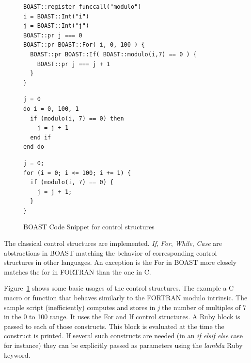 \documentclass[11pt, a4paper, twoside]{montblanc}
\begin{document}
\begin{figure}
\begin{lstlisting}
BOAST::register_funccall("modulo")
i = BOAST::Int("i")
j = BOAST::Int("j")
BOAST::pr j === 0
BOAST::pr BOAST::For( i, 0, 100 ) {
  BOAST::pr BOAST::If( BOAST::modulo(i,7) == 0 ) {
    BOAST::pr j === j + 1
  }
}
\end{lstlisting}

\begin{minipage}[b]{0.47\linewidth}
\centering
{}

\begin{lstlisting}
j = 0
do i = 0, 100, 1
  if (modulo(i, 7) == 0) then
    j = j + 1
  end if
end do
\end{lstlisting}
\end{minipage}
\hspace{0.04\linewidth}
\begin{minipage}[b]{0.47\linewidth}
\centering
{}

\begin{lstlisting}
j = 0;
for (i = 0; i <= 100; i += 1) {
  if (modulo(i, 7) == 0) {
    j = j + 1;
  }
}
\end{lstlisting}
\end{minipage}
\caption{BOAST Code Snippet for control structures}
\label{fig:BOAST_control}
\end{figure}

The classical control structures are implemented. \emph{If}, \emph{For},
\emph{While}, \emph{Case} are abstractions in BOAST matching the behavior of
corresponding control structures in other languages. An exception is the For in
BOAST more closely matches the for in FORTRAN than the one in C.

Figure~\ref{fig:BOAST_control} shows some basic usages of the control structures.
The example a C macro or function that behaves similarly to the FORTRAN modulo
intrinsic. The sample script (inefficiently) computes and stores in \emph{j} the
number of multiples of $7$ in the 0 to 100 range. It uses the For and If control
structures. A Ruby block is passed to each of those constructs. This block is
evaluated at the time the construct is printed. If several such constructs are
needed (in an \emph{if elsif else} case for instance) they can be explicitly
passed as parameters using the \emph{lambda} Ruby keyword.
\end{document}
